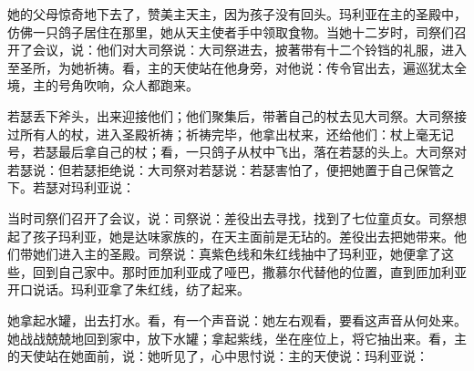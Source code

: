 她的父母惊奇地下去了，赞美主天主，因为孩子没有回头。玛利亚在主的圣殿中，仿佛一只鸽子居住在那里，她从天主使者手中领取食物。当她十二岁时，司祭们召开了会议，说：他们对大司祭说：大司祭进去，披著带有十二个铃铛的礼服，进入至圣所，为她祈祷。看，主的天使站在他身旁，对他说：传令官出去，遍巡犹太全境，主的号角吹响，众人都跑来。\par

若瑟丢下斧头，出来迎接他们；他们聚集后，带著自己的杖去见大司祭。大司祭接过所有人的杖，进入圣殿祈祷；祈祷完毕，他拿出杖来，还给他们：杖上毫无记号，若瑟最后拿自己的杖；看，一只鸽子从杖中飞出，落在若瑟的头上。大司祭对若瑟说：但若瑟拒绝说：大司祭对若瑟说：若瑟害怕了，便把她置于自己保管之下。若瑟对玛利亚说：\par

当时司祭们召开了会议，说：司祭说：差役出去寻找，找到了七位童贞女。司祭想起了孩子玛利亚，她是达味家族的，在天主面前是无玷的。差役出去把她带来。他们带她们进入主的圣殿。司祭说：真紫色线和朱红线抽中了玛利亚，她便拿了这些，回到自己家中。那时匝加利亚成了哑巴，撒慕尔代替他的位置，直到匝加利亚开口说话。玛利亚拿了朱红线，纺了起来。\par

她拿起水罐，出去打水。看，有一个声音说：她左右观看，要看这声音从何处来。她战战兢兢地回到家中，放下水罐；拿起紫线，坐在座位上，将它抽出来。看，主的天使站在她面前，说：她听见了，心中思忖说：主的天使说：玛利亚说：\par

